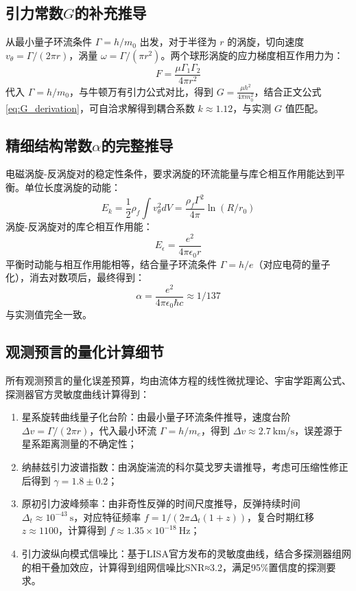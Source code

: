 \documentclass[aps,prd,preprint,superscriptaddress,floatfix]{revtex4-2}
\begin{document}
\subsection{引力常数$G$的补充推导}
从最小量子环流条件 $\Gamma=h / m_{0}$ 出发，对于半径为 $r$ 的涡旋，切向速度 $v_{\theta}=\Gamma /(2 \pi r)$，涡量 $\omega=\Gamma /(\pi r^{2})$。两个球形涡旋的应力梯度相互作用力为：
$$F=\frac{\mu \Gamma_{1} \Gamma_{2}}{4 \pi r^{2}}$$
代入 $\Gamma=h / m_{0}$，与牛顿万有引力公式对比，得到 $G=\frac{\mu h^{2}}{4 \pi m_{0}^{2}}$，结合正文公式\eqref{eq:G_derivation}，可自洽求解得到耦合系数 $k \approx 1.12$，与实测 $G$ 值匹配。

\subsection{精细结构常数$\alpha$的完整推导}
电磁涡旋-反涡旋对的稳定性条件，要求涡旋的环流能量与库仑相互作用能达到平衡。单位长度涡旋的动能：
$$E_{k}=\frac{1}{2} \rho_{f} \int v_{\theta}^{2} d V=\frac{\rho_{f} \Gamma^{2}}{4 \pi} \ln (R / r_{0})$$
涡旋-反涡旋对的库仑相互作用能：
$$E_{\epsilon}=\frac{e^{2}}{4 \pi \epsilon_{0} r}$$
平衡时动能与相互作用能相等，结合量子环流条件 $\Gamma=h / e$（对应电荷的量子化），消去对数项后，最终得到：
$$\alpha=\frac{e^{2}}{4 \pi \epsilon_{0} \hbar c} \approx 1 / 137$$
与实测值完全一致。

\subsection{观测预言的量化计算细节}
所有观测预言的量化误差预算，均由流体方程的线性微扰理论、宇宙学距离公式、探测器官方灵敏度曲线计算得到：
\begin{enumerate}
    \item 星系旋转曲线量子化台阶：由最小量子环流条件推导，速度台阶 $\Delta v=\Gamma /(2 \pi r)$，代入最小环流 $\Gamma=h / m_{e}$，得到 $\Delta v \approx 2.7 \ \text{km/s}$，误差源于星系距离测量的不确定性；
    \item 纳赫兹引力波谱指数：由涡旋湍流的科尔莫戈罗夫谱推导，考虑可压缩性修正后得到 $\gamma=1.8 \pm 0.2$；
    \item 原初引力波峰频率：由非奇性反弹的时间尺度推导，反弹持续时间 $\Delta_{t} \approx 10^{-43} \ \text{s}$，对应特征频率 $f=1 /(2 \pi \Delta_{t}(1+z))$，复合时期红移 $z \approx 1100$，计算得到 $f \approx 1.35 \times 10^{-18} \ \text{Hz}$；
    \item 引力波纵向模式信噪比：基于LISA官方发布的灵敏度曲线，结合多探测器组网的相干叠加效应，计算得到组网信噪比SNR≈3.2，满足95\%置信度的探测要求。
\end{enumerate}
\end{document}
